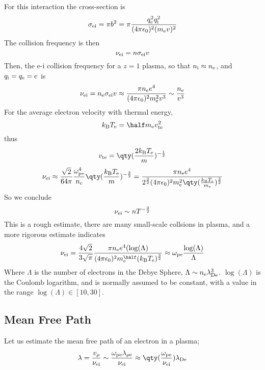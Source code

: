 \documentclass{book}         		                %
\begin{document}
For this interaction the cross-section is 
\begin{equation}
  \label{eq:17}
  \sigma_{\rm ei} = \pi b^2 = \pi \frac{q_{\rm e}^2 q_{\rm i}^2}{(4 \pi \epsilon_0)^2 (m_{\rm e} v)^2}
\end{equation}
The collision frequency is then
\[ \nu_{\rm ei} = n \sigma_{\rm ei} v \] Then, the e-i collision
frequency for a $z=1$ plasma, so that $n_{\rm i} \approx n_{\rm e}$,
and $q_{\rm i} = q_{\rm e} = e$ is
\begin{equation}
  \label{eq:18}
  \nu_{\rm ei} = n_{\rm e} \sigma_{\rm ei} v \approx \frac{\pi n_{\rm e} e^4}{(4 \pi \epsilon_0)^2 m_{\rm e}^2 v^3} \sim \frac{n_{\rm e}}{v^3}
\end{equation}
For the average electron velocity with thermal energy,
\[ k_{\rm B} T_{\rm e} = \half m_{\rm e} v_{\rm te}^2 \]
thus
\[ v_{\rm te} = \qty( \frac{2 k_{\rm B} T_{\rm e}}{m}
)^{-\frac{1}{2}} \]
\begin{equation}
  \label{eq:19}
  \nu_{\rm ei} \approx \frac{\sqrt{2}}{64 \pi} \frac{\omega_{\rm pe}^4}{n_{\rm e}} \qty( \frac{k_{\rm B} T_{\rm e}}{m})^{-\frac{3}{2}} = \frac{\pi n_{\rm e} e^4}{2^{\frac{3}{2}} (4 \pi \epsilon_0)^2 m_{\rm e}^2 \qty( \frac{k_{\rm B} T_{\rm e}}{m_{\rm e}})^{\frac{3}{2}}}
\end{equation}
So we conclude
\[ \nu_{\rm ei} \sim nT^{- \frac{3}{2}} \] This is a rough estimate,
there are many small-scale collsions in plasma, and a more rigorous
estimate indicates
\begin{equation}
  \label{eq:20}
  \nu_{\rm ei} = \frac{4 \sqrt{2}}{3 \sqrt{\pi}} \frac{\pi n_{\rm e} e^4 (\log(\Lambda)}{(4 \pi \epsilon_0)^2 m_{\rm e}^{\half} (k_{\rm B}T_{\rm e})^{\frac{3}{2}}} \approx \omega_{\rm pe} \frac{\log(\Lambda)}{\Lambda}
\end{equation}
Where $\Lambda$ is the number of electrons in the Debye Sphere,
$\Lambda \sim n_{\rm e} \lambda^3_{\rm De}$.  $\log(\Lambda)$ is the
Coulomb logarithm, and is normally assumed to be constant, with a
value in the range $\log(\Lambda) \in [10,30]$.

\subsection{Mean Free Path}
\label{sec:mean-free-path}

Let us estimate the mean free path of an electron in a plasma;
\[ \lambda = \frac{v_{\rho}}{\nu_{\rm ei}} \sim \frac{\omega_{\rm pe}
  \lambda_{\rho \rm e}}{\nu_{\rm ei}} \approx \qty( \frac{\omega_{\rm
    pe}}{\nu_{\rm ei}}) \lambda_{\rm De} \]
\end{document}
